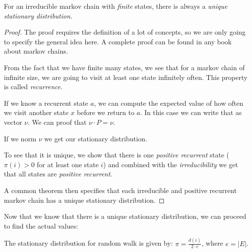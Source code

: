 \vspace{0.5cm}

\begin{thm}
For an irreducible markov chain with {\em finite} states, there is always a {\em unique stationary distribution}.
\end{thm}

\begin{proof}
The proof requires the definition of a lot of concepts, so we are only going to specify the general idea here.
A complete proof can be found in any book about markov chains.

From the fact that we have finite many states, we see that for a markov chain of infinite size, we are going to visit at least one state
infinitely often. This property is called {\em recurrence}.

If we know a recurrent state $a$, we can compute the expected value of how often we visit another state $x$ before we return to $a$.
In this case we can write that as vector $\nu$. We can proof that $\nu \cdot P = \nu$.

If we norm $\nu$ we get our stationary distribution.

To see that it is unique, we show that there is one {\em positive recurrent} state ($\pi(i) > 0$ for at least one state $i$)
and combined with the {\em irreducibility} we get that all states are {\em positive recurrent}.

A common theorem then specifies that each irreducible and positive recurrent markov chain has a unique stationary distribution.
\end{proof}

Now that we know that there is a unique stationary distribution, we can
proceed to find the actual values:

\vspace{0.5cm}

\begin{thm}
The stationary distribution for random walk is given by: $\pi = \frac{d(i)}{2 \cdot e}$, where $e = |E|$.
\end{thm}

